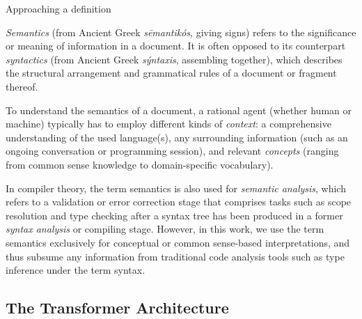 \begin{genericbox}{Approaching a definition}

	\emph{Semantics} (from Ancient Greek \emph{sēmantikós}, giving signs) refers to the significance or meaning of information in a document.
	It is often opposed to its counterpart \emph{syntactics} (from Ancient Greek \emph{sýntaxis}, assembling together), %
	which describes the structural arrangement and grammatical rules of a document or fragment thereof.

	To understand the semantics of a document, a rational agent (whether human or machine) typically has to employ different kinds of \emph{context}: a comprehensive understanding of the used language(s), any surrounding information (such as an ongoing conversation or programming session), and relevant \emph{concepts} (ranging from common sense knowledge to domain-specific vocabulary).

	In compiler theory, the term semantics is also used for \emph{semantic analysis}, which refers to a validation or error correction stage that comprises tasks such as scope resolution and type checking after a syntax tree has been produced in a former \emph{syntax analysis} or compiling stage.
	However, in this work, we use the term semantics exclusively for conceptual or common sense-based interpretations, and thus subsume any information from traditional code analysis tools such as type inference under the term syntax.
\end{genericbox}

\subsection*{The Transformer Architecture}
\label{sec:background/semtec/transformers}

